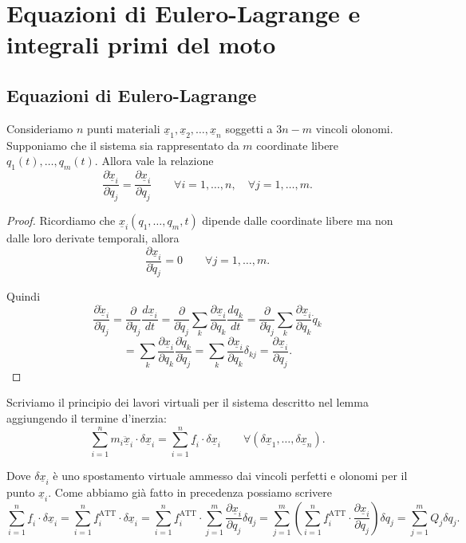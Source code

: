 \chapter{Equazioni di Eulero-Lagrange e integrali primi del moto}

\section{Equazioni di Eulero-Lagrange}
\begin{lemma}{}
Consideriamo $n$ punti materiali $\underline{x}_1, \underline{x}_2, \ldots, \underline{x}_n$ soggetti a $3n - m$ vincoli olonomi. Supponiamo che il sistema sia rappresentato da $m$ coordinate libere $q_1(t), \ldots, q_m(t)$. Allora vale la relazione
\[
\frac{\partial \dot{\underline{x}}_i}{\partial \dot{q}_j}
=
\frac{\partial \underline{x}_i}{\partial q_j}
\qquad
\forall i = 1,\ldots,n,\quad \forall j = 1,\ldots,m .
\]
\end{lemma}
\begin{proof}
Ricordiamo che $\underline{x}_i(q_1,\ldots,q_m,t)$ dipende dalle coordinate libere ma non dalle loro derivate temporali, allora
\[
\frac{\partial \underline{x}_i}{\partial \dot{q}_j} = 0
\qquad \forall j = 1,\ldots,m .
\]

Quindi
\[
\frac{\partial \dot{\underline{x}}_i}{\partial \dot{q}_j}
=
\frac{\partial}{\partial \dot{q}_j}
\frac{d\underline{x}_i}{dt}
=
\frac{\partial}{\partial \dot{q}_j}
\sum_k
\frac{\partial \underline{x}_i}{\partial q_k}
\frac{dq_k}{dt}
=
\frac{\partial}{\partial \dot{q}_j}
\sum_k
\frac{\partial \underline{x}_i}{\partial q_k}
\dot{q}_k
\]
\[
=
\sum_k
\frac{\partial \underline{x}_i}{\partial q_k}
\frac{\partial \dot{q}_k}{\partial \dot{q}_j}
=
\sum_k
\frac{\partial \underline{x}_i}{\partial q_k}
\delta_{kj}
=
\frac{\partial \underline{x}_i}{\partial q_j}.
\]
\end{proof}

Scriviamo il principio dei lavori virtuali per il sistema descritto nel lemma aggiungendo il termine d'inerzia:
\[
\sum_{i=1}^{n} m_i \ddot{\underline{x}}_i \cdot \delta \underline{x}_i
=
\sum_{i=1}^{n} \underline{f}_i \cdot \delta \underline{x}_i
\qquad
\forall \left(\delta \underline{x}_1,\ldots,\delta \underline{x}_n\right).
\]

Dove $\delta \underline{x}_i$ è uno spostamento virtuale ammesso dai vincoli perfetti e olonomi per il punto $\underline{x}_i$. Come abbiamo già fatto in precedenza possiamo scrivere
\[
\sum_{i=1}^{n} \underline{f}_i \cdot \delta \underline{x}_i
=
\sum_{i=1}^{n} \underline{f}_i^{\mathrm{ATT}} \cdot \delta \underline{x}_i
=
\sum_{i=1}^{n} \underline{f}_i^{\mathrm{ATT}} \cdot
\sum_{j=1}^{m}
\frac{\partial \underline{x}_i}{\partial q_j}\delta q_j
=
\sum_{j=1}^{m}
\left(
\sum_{i=1}^{n}
\underline{f}_i^{\mathrm{ATT}} \cdot
\frac{\partial \underline{x}_i}{\partial q_j}
\right)\delta q_j
=
\sum_{j=1}^{m} Q_j \delta q_j.
\]

